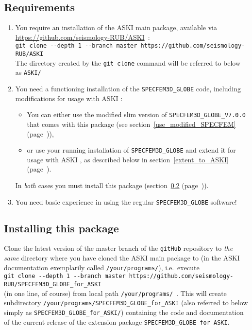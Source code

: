 \documentclass[12pt,a4paper]{article}
\newcommand{\lcode}[1]{\nolinkurl{#1}}
\newcommand{\ASKI}{ {\ttfamily ASKI} }
\newcommand{\myref}[1]{\ref{#1} (page~\pageref{#1})}
\begin{document}
\subsection{Requirements} %
\begin{enumerate}
 \item You require an installation of the \ASKI{} main package, available via
   \url{https://github.com/seismology-RUB/ASKI}~:\\
   \lcode{git clone --depth 1 --branch master https://github.com/seismology-RUB/ASKI}\\
   The directory created by the \lcode{git clone} command will be referred to 
   below as \lcode{ASKI/}
\item You need a functioning installation of the \lcode{SPECFEM3D_GLOBE} code, including 
   modifications for usage with \ASKI{}:
   \begin{itemize}
   \item You can either use the modified slim version of \lcode{SPECFEM3D_GLOBE_V7.0.0} 
     that comes with this package (see section~\myref{use_modified_SPECFEM}{}),
   \item or use your running installation of \lcode{SPECFEM3D_GLOBE} and extend it for usage 
     with \ASKI{}, as described below in section~\myref{extent_to_ASKI}{}.
   \end{itemize}
   In \emph{both} cases you must install this package (section~\myref{install_this_package}).

 \item You need basic experience in using the regular \lcode{SPECFEM3D_GLOBE} software!
\end{enumerate}

\subsection{Installing this package} \label{install_this_package}
Clone the latest version of the master branch of the \lcode{gitHub} repository to \emph{the same} directory 
where you have cloned the \ASKI{} main package to (in the \ASKI{} documentation exemplarily called 
\lcode{/your/programs/}), i.e.\ execute\\
\lcode{git clone --depth 1 --branch master https://github.com/seismology-RUB/SPECFEM3D_GLOBE_for_ASKI}\\
(in one line, of course) from local path \lcode{/your/programs/}~. 
This will create subdirectory \lcode{/your/programs/SPECFEM3D_GLOBE_for_ASKI} (also referred to below simply
as \lcode{SPECFEM3D_GLOBE_for_ASKI/}) containing
the code and documentation of the current release of the extension package \lcode{SPECFEM3D_GLOBE for ASKI}.
\end{document}
